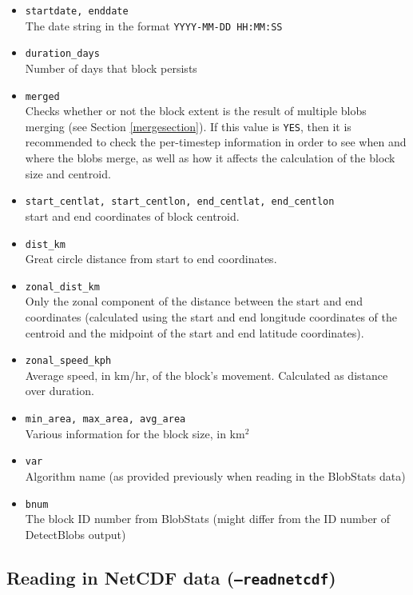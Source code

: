 \documentclass{article}
\begin{document}
\begin{itemize}
\item[]\texttt{startdate, enddate}\\The date string in the format \texttt{YYYY-MM-DD HH:MM:SS}
\item[] \texttt{duration\_days}\\ Number of days that block persists
\item[] \texttt{merged}\\ Checks whether or not the block extent is the result of multiple blobs merging (see Section \ref{mergesection}). If this value is \texttt{YES}, then it is recommended to check the per-timestep information in order to see when and where the blobs merge, as well as how it affects the calculation of the block size and centroid.
\item[] \texttt{start\_centlat, start\_centlon, end\_centlat, end\_centlon}\\ start and end coordinates of block centroid.
\item[] \texttt{dist\_km}\\ Great circle distance from start to end coordinates.
\item[] \texttt{zonal\_dist\_km} \\ Only the zonal component of the distance between the start and end coordinates (calculated using the start and end longitude coordinates of the centroid and the midpoint of the start and end latitude coordinates).
\item[] \texttt{zonal\_speed\_kph} \\Average speed, in km/hr, of the block's movement. Calculated as distance over duration.
\item[] \texttt{min\_area, max\_area, avg\_area} \\ Various information for the block size, in km$^2$
\item[] \texttt{var}\\Algorithm name (as provided previously when reading in the BlobStats data)
\item[] \texttt{bnum}\\ The block ID number from BlobStats (might differ from the ID number of DetectBlobs output)
\end{itemize}


\subsection{Reading in NetCDF data (\texttt{--readnetcdf})}
\end{document}
